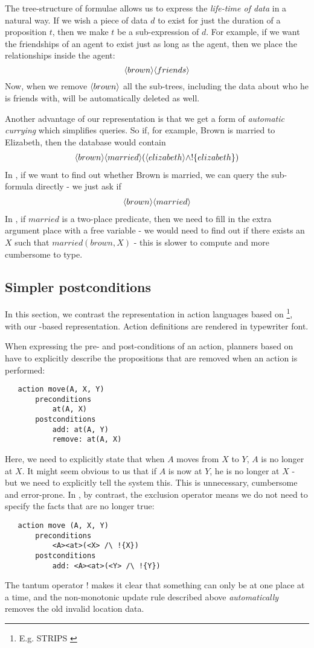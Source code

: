 The tree-structure of formulae allows us to express the \emph{life-time of data} in a natural way. 
If we wish a piece of data $d$ to exist for just the duration of a proposition $t$, then we make $t$ be a sub-expression of $d$. 
For example, if we want the friendships of an agent to exist just as long as the agent, then we place the relationships inside the agent: 
\[
\langle brown \rangle \langle friends \rangle \]
Now, when we remove $\MAY{brown}$ all the sub-trees, including the data about who he is friends with, will be automatically deleted as well.

Another advantage of our representation is that we get a form of \emph{automatic currying} which simplifies queries.
So if, for example, Brown is married to Elizabeth, then the database would contain 
\begin{eqnarray*}
\langle brown \rangle \langle married \rangle (\langle elizabeth \rangle \land ! \{elizabeth\})
\end{eqnarray*}
In \cathoristic{}, if we want to find out whether Brown is married, we can query the sub-formula directly -  we just ask if 
\begin{eqnarray*}
\langle brown \rangle \langle married \rangle \end{eqnarray*}
In \fol, if $married$ is a two-place predicate, then we need to fill in the extra argument place with a free variable - we would need to find out if there exists an $X$ such that $married(brown, X)$ - this is slower to compute and more cumbersome to type. 

\subsection{Simpler postconditions}

In this section, we contrast the representation in action languages based on \fol{}\footnote{E.g. STRIPS \cite{strips}}, with our \cathoristic{}-based representation.
Action definitions are rendered in typewriter font.

When expressing the pre- and post-conditions of an action, planners
based on \fol{} have to explicitly describe the propositions that
are removed when an action is performed:
\begin{verbatim}
   action move(A, X, Y)
       preconditions
           at(A, X)
       postconditions
           add: at(A, Y) 
           remove: at(A, X)
\end{verbatim}
Here, we need to explicitly state that when $A$ moves from $X$ to $Y$, $A$ is no longer at $X$. It might seem obvious to us that if $A$ is now at $Y$, he is no longer at $X$ - but we need to explicitly tell the system this. This is unnecessary, cumbersome and error-prone. In \cathoristic{}, by contrast, the exclusion operator means we do not need to specify the facts that are no longer true:
\begin{verbatim}
   action move (A, X, Y)
       preconditions
           <A><at>(<X> /\ !{X})
       postconditions
           add: <A><at>(<Y> /\ !{Y})
\end{verbatim}
The tantum operator $!$ makes it clear that something can only be at one
place at a time, and the non-monotonic update rule described above
\emph{automatically} removes the old invalid location data.

